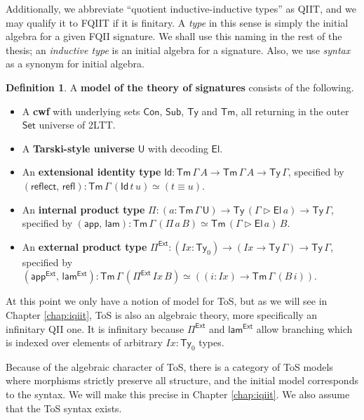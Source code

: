 \documentclass[12pt,a4paper,twoside,openany]{book}
\theoremstyle{remark}
\theoremstyle{definition}
\newtheorem{mydefinition}{Definition}
\theoremstyle{theorem}
\newcommand{\mi}[1]{\mathit{#1}}
\newcommand{\ms}[1]{\mathsf{#1}}
\newcommand{\refl}{\mathsf{refl}}
\newcommand{\reflect}{\mathsf{reflect}}
\newcommand{\Con}{\mathsf{Con}}
\newcommand{\Sub}{\mathsf{Sub}}
\newcommand{\Tm}{\mathsf{Tm}}
\newcommand{\Ty}{\mathsf{Ty}}
\newcommand{\U}{\mathsf{U}}
\newcommand{\El}{\mathsf{El}}
\newcommand{\Id}{\mathsf{Id}}
\newcommand{\Set}{\mathsf{Set}}
\newcommand{\ext}{\triangleright}
\newcommand{\Pie}{\Pi^{\mathsf{Ext}}}
\newcommand{\appe}{\mathsf{app^{Ext}}}
\newcommand{\lame}{\mathsf{lam^{Ext}}}
\newcommand{\app}{\ms{app}}
\newcommand{\lam}{\ms{lam}}
\begin{document}
Additionally, we abbreviate ``quotient inductive-inductive types'' as QIIT, and
we may qualify it to FQIIT if it is finitary. A \emph{type} in this sense is
simply the initial algebra for a given FQII signature. We shall use this naming
in the rest of the thesis; an \emph{inductive type} is an initial algebra for a
signature. Also, we use \emph{syntax} as a synonym for initial algebra.

\begin{mydefinition}
\label{def:fqiit-tos}
A \textbf{model of the theory of signatures} consists of the following.
  \begin{itemize}
    \item A \textbf{cwf} with underlying sets $\Con$, $\Sub$, $\Ty$ and $\Tm$, all returning in
      the outer $\Set$ universe of 2LTT.
    \item A \textbf{Tarski-style universe} $\U$ with decoding $\El$.
    \item An \textbf{extensional identity type} $\Id : \Tm\,\Gamma\,A \to
      \Tm\,\Gamma\,A \to \Ty\,\Gamma$, specified by $(\reflect,\,\refl) :
      \Tm\,\Gamma\,(\Id\,t\,u) \simeq (t \equiv u)$.
    \item An \textbf{internal product type} $\Pi : (a : \Tm\,\Gamma\,\U) \to
      \Ty\,(\Gamma\ext\El\,a) \to \Ty\,\Gamma$, specified by
      $(\app,\,\lam) : \Tm\,\Gamma\,(\Pi\,a\,B) \simeq \Tm\,(\Gamma \ext \El\,a)\,B$.
    \item An \textbf{external product type} $\Pie : (\mi{Ix} : \Ty_0) \to (\mi{Ix} \to \Ty\,\Gamma) \to \Ty\,\Gamma$, specified by
      $(\appe,\,\lame) : \Tm\,\Gamma\,(\Pie\,\mi{Ix}\,B) \simeq ((i : \mi{Ix}) \to \Tm\,\Gamma\,(B\,i))$.
  \end{itemize}
\end{mydefinition}
At this point we only have a notion of model for ToS, but as we will see in
Chapter \ref{chap:iqiit}, ToS is also an algebraic theory, more specifically an
infinitary QII one. It is infinitary because $\Pie$ and $\lame$ allow branching
which is indexed over elements of arbitrary $\mi{Ix} : \Ty_0$ types.

Because of the algebraic character of ToS, there is a category of ToS models
where morphisms strictly preserve all structure, and the initial model
corresponds to the syntax. We will make this precise in Chapter
\ref{chap:iqiit}. We also assume that the ToS syntax exists.
\end{document}
